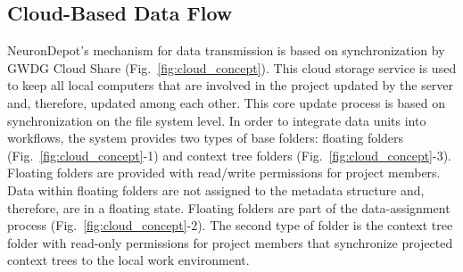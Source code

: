 \documentclass{frontiersSCNS} %
\begin{document}
\subsection{Cloud-Based Data Flow}
\label{cloudBased}
NeuronDepot's mechanism for data transmission is based on synchronization by
GWDG Cloud Share (Fig.~\ref{fig:cloud_concept}). This cloud storage service is
used to keep all local computers that are involved in the project updated by
the server and, therefore, updated among each other. This core update process
is based on synchronization on the file system level. In order to integrate
data units into workflows, the system provides two types of base folders:
floating folders (Fig.~\ref{fig:cloud_concept}-1) and context tree folders
(Fig.~\ref{fig:cloud_concept}-3). Floating folders are provided with read/write
permissions for project members. Data within floating folders are not assigned
to the metadata structure and, therefore, are in a floating state. Floating
folders are part of the data-assignment process
(Fig.~\ref{fig:cloud_concept}-2). The second type of folder is the context tree
folder with read-only permissions for project members that synchronize
projected context trees to the local work
environment.
\end{document}
